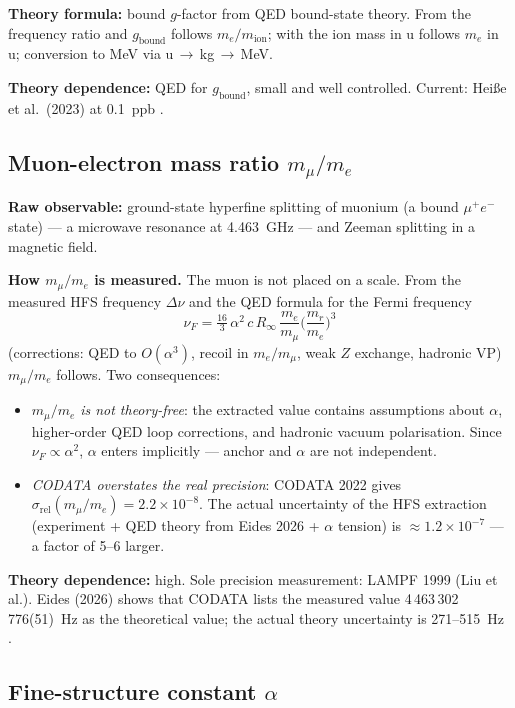 \textbf{Theory formula:} bound $g$-factor from QED bound-state theory. From the frequency ratio and $g_\text{bound}$ follows $m_e/m_\text{ion}$; with the ion mass in u follows $m_e$ in u; conversion to MeV via u\,$\to$\,kg\,$\to$\,MeV.

\textbf{Theory dependence:} QED for $g_\text{bound}$, small and well controlled. Current: Heiße et al.\ (2023) at 0.1~ppb \QM.

\subsection{Muon-electron mass ratio $m_\mu/m_e$}

\textbf{Raw observable:} ground-state hyperfine splitting of muonium (a bound $\mu^+e^-$ state) --- a microwave resonance at 4.463~GHz --- and Zeeman splitting in a magnetic field.

\textbf{How $m_\mu/m_e$ is measured.} The muon is not placed on a scale.
From the measured HFS frequency $\Delta\nu$ and the QED formula for the Fermi frequency
\begin{equation}
\nu_F=\tfrac{16}{3}\,\alpha^2\,c\,R_\infty\,\frac{m_e}{m_\mu}\Big(\frac{m_r}{m_e}\Big)^3
\end{equation}
(corrections: QED to $O(\alpha^3)$, recoil in $m_e/m_\mu$, weak $Z$ exchange, hadronic VP) $m_\mu/m_e$ follows. Two consequences:
\begin{itemize}\itemsep2pt
\item $m_\mu/m_e$ \emph{is not theory-free}: the extracted value contains assumptions about
  $\alpha$, higher-order QED loop corrections, and hadronic vacuum polarisation.
  Since $\nu_F\propto\alpha^2$, $\alpha$ enters implicitly --- anchor and $\alpha$ are not independent.
\item \emph{CODATA overstates the real precision}: CODATA 2022
  gives $\sigma_\text{rel}(m_\mu/m_e)=2.2\times10^{-8}$. The actual uncertainty of the
  HFS extraction (experiment + QED theory from Eides 2026 + $\alpha$ tension)
  is $\approx1.2\times10^{-7}$ --- a factor of 5--6 larger. \QM{}
\end{itemize}

\textbf{Theory dependence:} high. Sole precision measurement: LAMPF 1999 (Liu et al.). Eides (2026) shows that CODATA lists the measured value 4\,463\,302\,776(51)~Hz as the theoretical value; the actual theory uncertainty is 271--515~Hz \QM.

\subsection{Fine-structure constant $\alpha$}

